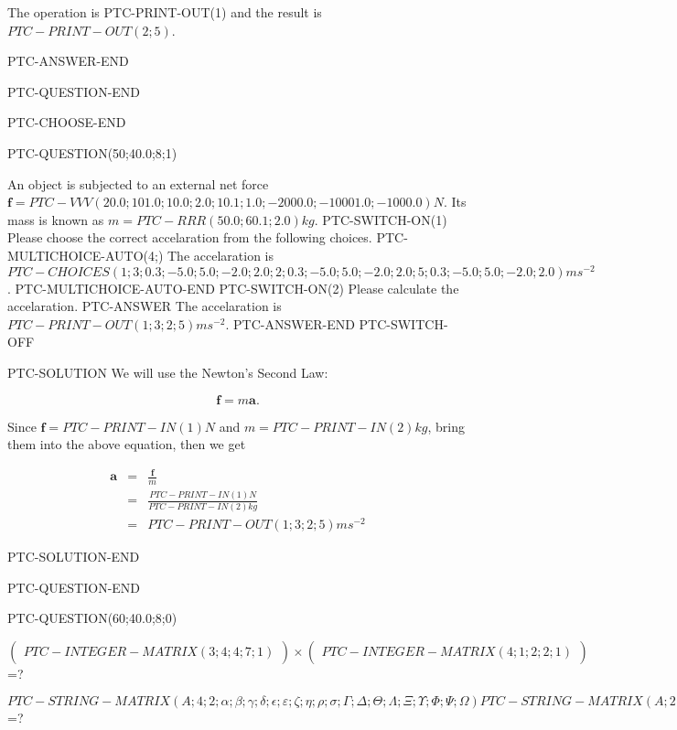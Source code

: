 \documentclass[12pt]{article}
\begin{document}
The operation is PTC-PRINT-OUT(1) and the result is
$PTC-PRINT-OUT(2;5)$.

PTC-ANSWER-END

\vspace{0.3in}
PTC-QUESTION-END



PTC-CHOOSE-END


PTC-QUESTION(50;40.0;8;1)

An object is subjected to an external net force $\mathbf{f}=
PTC-VVV (20.0; 101.0; 10.0; 2.0; 10.1; 1.0;-2000.0; -10001.0; -1000.0)N$.
Its mass is known as $m=PTC-RRR (50.0; 60.1; 2.0) kg$.
PTC-SWITCH-ON(1)
  Please choose the correct accelaration from the following choices.
  PTC-MULTICHOICE-AUTO(4;)
  The accelaration is $ PTC-CHOICES (1;
    3;0.3;-5.0; 5.0; -2.0; 2.0;
    2;0.3;-5.0; 5.0; -2.0; 2.0;
    5;0.3;-5.0; 5.0; -2.0; 2.0)ms^{-2} $.
  PTC-MULTICHOICE-AUTO-END
PTC-SWITCH-ON(2)
  Please calculate the accelaration.
  \vspace{3.0in}
  PTC-ANSWER
  The accelaration is $PTC-PRINT-OUT(1;3;2;5)ms^{-2}$.
  PTC-ANSWER-END
PTC-SWITCH-OFF

PTC-SOLUTION
We will use the Newton's Second Law:

\[
\mathbf{f}=m\mathbf{a}.
\]

Since $\mathbf{f}=PTC-PRINT-IN(1)N$
and $m=PTC-PRINT-IN(2)kg$, bring them into the above equation, then we get

\begin{eqnarray*}
\mathbf{a}&=&\frac{\mathbf{f}}m  \\
&=&\frac{PTC-PRINT-IN(1)N}{PTC-PRINT-IN(2)kg}  \\
&=&PTC-PRINT-OUT(1;3;2;5)ms^{-2}
\end{eqnarray*}

PTC-SOLUTION-END


\vspace{0.3in}
PTC-QUESTION-END




PTC-QUESTION(60;40.0;8;0)

$ \left( \begin{array}{ccccccccc}
 PTC-INTEGER-MATRIX(3;4;4;7;1)
 \end{array}\right) \times
\left( \begin{array}{c}
 PTC-INTEGER-MATRIX(4;1;2;2;1)
 \end{array}\right) $ =?


$ PTC-STRING-MATRIX(A;4;2; \alpha ; \beta ; \gamma ; \delta ; \epsilon ; \varepsilon ;
                   \zeta ; \eta ; \rho ; \sigma ; \Gamma ; \Delta ; \Theta ; \Lambda ;
                   \Xi ; \Upsilon ; \Phi ; \Psi ; \Omega )
 PTC-STRING-MATRIX(A;2;1; \beta ; \gamma ) $ =?
\end{document}
